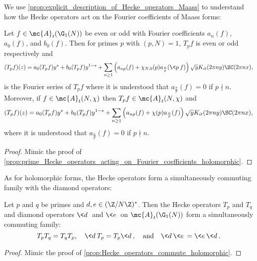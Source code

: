     We use \cref{prop:explicit_description_of_Hecke_operators_Maass} to understand how the Hecke operators act on the Fourier coefficients of Maass forms:

    \begin{proposition}\label{prop:prime_Hecke_operators_acting_on_Fourier_coefficients_Maass}
      Let $f \in \mc{A}_{t}(\G_{1}(N))$ be even or odd with Fourier coefficients $a_{n}(f)$, $a_{0}(f)$, and $b_{0}(f)$. Then for primes $p$ with $(p,N) = 1$, $T_{p}f$ is even or odd respectively and
      \[
        (T_{p}f)(z) = a_{0}(T_{p}f)y^{s}+b_{0}(T_{p}f)y^{1-s}+\sum_{n \ge 1}\left(a_{np}(f)+\chi_{N,0}(p)a_{\frac{n}{p}}(\<p\>f)\right)\sqrt{y}K_{it}(2\pi ny)\SC(2\pi nx),
      \]
      is the Fourier series of $T_{p}f$ where it is understood that $a_{\frac{n}{p}}(f) = 0$ if $p \nmid n$. Moreover, if $f \in \mc{A}_{t}(N,\chi)$ then $T_{p}f \in \mc{A}_{t}(N,\chi)$ and
      \[
        (T_{p}f)(z) = a_{0}(T_{p}f)y^{s}+b_{0}(T_{p}f)y^{1-s}+\sum_{n \ge 1}\left(a_{np}(f)+\chi(p)a_{\frac{n}{p}}(f)\right)\sqrt{y}K_{it}(2\pi ny)\SC(2\pi nx),
      \]
      where it is understood that $a_{\frac{n}{p}}(f) = 0$ if $p \nmid n$.
    \end{proposition}
    \begin{proof}
      Mimic the proof of \cref{prop:prime_Hecke_operators_acting_on_Fourier_coefficients_holomorphic}.
    \end{proof}

    As for holomorphic forms, the Hecke operators form a simultaneously commuting family with the diamond operators:

    \begin{proposition}\label{prop:Hecke_operators_commute_Maass}
      Let $p$ and $q$ be primes and $d,e \in (\Z/N\Z)^{\ast}$. Then the Hecke operators $T_{p}$ and $T_{q}$ and diamond operators $\<d\>$ and $\<e\>$ on $\mc{A}_{t}(\G_{1}(N))$ form a simultaneously commuting family:
      \[
        T_{p}T_{q} = T_{q}T_{p}, \quad \<d\>T_{p} = T_{p}\<d\>, \quad \text{and} \quad \<d\>\<e\> = \<e\>\<d\>.
      \]
    \end{proposition}
    \begin{proof}
      Mimic the proof of \cref{prop:Hecke_operators_commute_holomorphic}.
    \end{proof}

